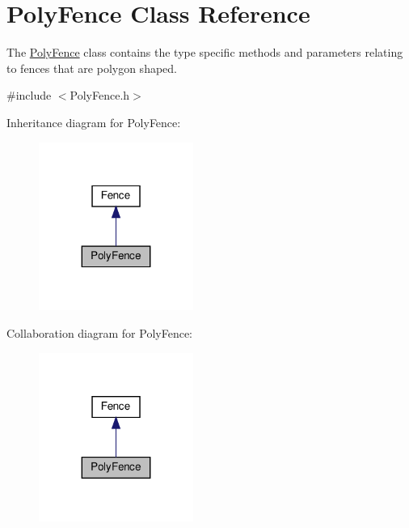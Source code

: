 \hypertarget{class_poly_fence}{}\section{Poly\+Fence Class Reference}
\label{class_poly_fence}


The \hyperlink{class_poly_fence}{Poly\+Fence} class contains the type specific methods and parameters relating to fences that are polygon shaped.  




{\ttfamily \#include $<$Poly\+Fence.\+h$>$}



Inheritance diagram for Poly\+Fence\+:\nopagebreak
\begin{figure}[H]
\begin{center}
\leavevmode
\includegraphics[width=143pt]{d9/ddf/class_poly_fence__inherit__graph}
\end{center}
\end{figure}


Collaboration diagram for Poly\+Fence\+:\nopagebreak
\begin{figure}[H]
\begin{center}
\leavevmode
\includegraphics[width=143pt]{d2/d10/class_poly_fence__coll__graph}
\end{center}
\end{figure}
